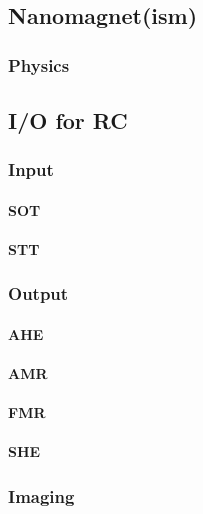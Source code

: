 \section{}\label{sec:ASI} %
\subsection{Nanomagnet(ism)}
\subsubsection{Physics} %
\subsection{I/O for RC}
\subsubsection{Input}
\paragraph{SOT}
\paragraph{STT} %
\subsubsection{Output}
\paragraph{AHE}
\paragraph{AMR} %
\paragraph{FMR} %
\paragraph{SHE} %
\cite{SHE}
\subsubsection{Imaging} %
